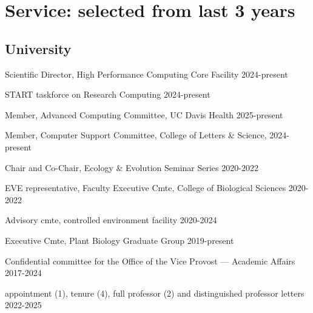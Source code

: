 \documentclass[letterpaper,10pt]{article}
\newcommand{\ignore}[1]{}
\renewenvironment{itemize}{
  \begin{list}{}{
    \setlength{\leftmargin}{1.5em}
  }
}{
  \end{list}
}
\begin{document}
\section*{Service: selected from last 3 years}
\begin{itemize}
\setlength\itemsep{0ex}
\subsection*{University}
\item Scientific Director, High Performance Computing Core Facility \hfill 2024-present
\item START taskforce on Research Computing \hfill 2024-present
\item Member, Advanced Computing Committee, UC Davis Health \hfill 2025-present
\item Member, Computer Support Committee, College of Letters \& Science, \hfill 2024-present
\item Chair and Co-Chair, Ecology \& Evolution Seminar Series \hfill 2020-2022
\item EVE representative, Faculty Executive Cmte, College of Biological Sciences \hfill 2020-2022
\item Advisory cmte, controlled environment facility \hfill 2020-2024
\item Executive Cmte, Plant Biology Graduate Group \hfill 2019-present
\item Confidential committee for the Office of the Vice Provost --- Academic Affairs  \hfill2017-2024 %
\item \ignore{Todesco 2022} appointment (1), \ignore {Mandel 2023, Cornejo 2022, Grace Lee 2024, Hodgins 2023} tenure (4), \ignore{Lowry 2023, Hernandez 2021} full professor (2)  and distinguished professor \ignore{Dawe 2024} letters \hfill 2022-2025

\end{itemize}
\end{document}
